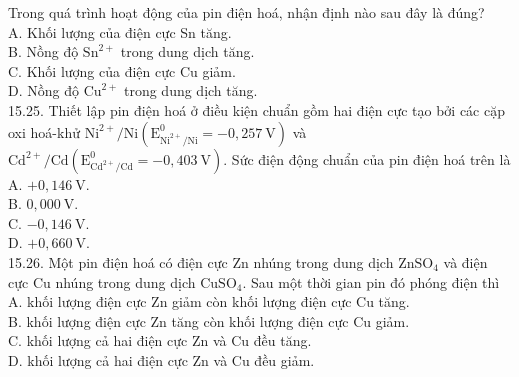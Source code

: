 \documentclass[10pt]{article}
\begin{document}
Trong quá trình hoạt động của pin điện hoá, nhận định nào sau đây là đúng?\\
A. Khối lượng của điện cực Sn tăng.\\
B. Nồng độ $\mathrm{Sn}^{2+}$ trong dung dịch tăng.\\
C. Khối lượng của điện cực Cu giảm.\\
D. Nồng độ $\mathrm{Cu}^{2+}$ trong dung dịch tăng.\\
15.25. Thiết lập pin điện hoá ở điều kiện chuẩn gồm hai điện cực tạo bởi các cặp oxi hoá-khử $\mathrm{Ni}^{2+} / \mathrm{Ni}\left(\mathrm{E}_{\mathrm{Ni}^{2+} / \mathrm{Ni}}^{0}=-0,257 \mathrm{~V}\right)$ và $\mathrm{Cd}^{2+} / \mathrm{Cd}\left(\mathrm{E}_{\mathrm{Cd}^{2+} / \mathrm{Cd}}^{0}=-0,403 \mathrm{~V}\right)$. Sức điện động chuẩn của pin điện hoá trên là\\
A. $+0,146 \mathrm{~V}$.\\
B. $0,000 \mathrm{~V}$.\\
C. $-0,146 \mathrm{~V}$.\\
D. $+0,660 \mathrm{~V}$.\\
15.26. Một pin điện hoá có điện cực Zn nhúng trong dung dịch $\mathrm{ZnSO}_{4}$ và điện cực Cu nhúng trong dung dịch $\mathrm{CuSO}_{4}$. Sau một thời gian pin đó phóng điện thì\\
A. khối lượng điện cực Zn giảm còn khối lượng điện cực Cu tăng.\\
B. khối lượng điện cực Zn tăng còn khối lượng điện cực Cu giảm.\\
C. khối lượng cả hai điện cực Zn và Cu đều tăng.\\
D. khối lượng cả hai điện cực Zn và Cu đều giảm.
\end{document}
